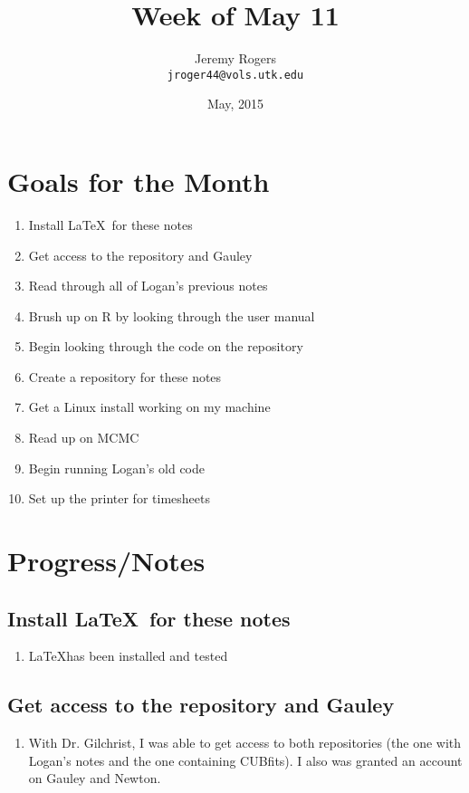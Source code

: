 \documentclass[12 pt]{article}
\title{Week of May 11}
\author{Jeremy Rogers \\
	\texttt{jroger44@vols.utk.edu}}
\date{May, 2015}
\begin{document}
	\maketitle
	
	\tableofcontents
	
	\section{Goals for the Month}
	\begin{enumerate}
		\item Install \LaTeX\ for these notes
		\item Get access to the repository and Gauley
		\item Read through all of Logan's previous notes
		\item Brush up on R by looking through the user manual
		\item Begin looking through the code on the repository
		\item Create a repository for these notes
		\item Get a Linux install working on my machine
		\item Read up on MCMC
		\item Begin running Logan's old code
		\item Set up the printer for timesheets
	\end{enumerate}
	
	\section{Progress/Notes}
	
	\subsection{Install \LaTeX\ for these notes}
		\begin{enumerate}
			\item \LaTeX has been installed and tested
		\end{enumerate}
	
	\subsection{Get access to the repository and Gauley}
		 \begin{enumerate}
		 	\item With Dr. Gilchrist, I was able to get access to both repositories (the one with Logan's notes and the one containing CUBfits). I also was granted an account on Gauley and Newton.
		 \end{enumerate}
\end{document}
